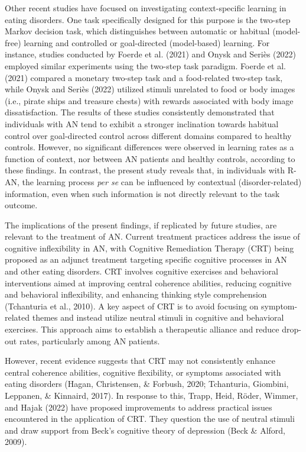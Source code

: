 \documentclass[
  man,floatsintext]{apa6}
\begin{document}
Other recent studies have focused on investigating context-specific learning in eating disorders. One task specifically designed for this purpose is the two-step Markov decision task, which distinguishes between automatic or habitual (model-free) learning and controlled or goal-directed (model-based) learning. For instance, studies conducted by Foerde et al. (2021) and Onysk and Seriès (2022) employed similar experiments using the two-step task paradigm. Foerde et al. (2021) compared a monetary two-step task and a food-related two-step task, while Onysk and Seriès (2022) utilized stimuli unrelated to food or body images (i.e., pirate ships and treasure chests) with rewards associated with body image dissatisfaction. The results of these studies consistently demonstrated that individuals with AN tend to exhibit a stronger inclination towards habitual control over goal-directed control across different domains compared to healthy controls. However, no significant differences were observed in learning rates as a function of context, nor between AN patients and healthy controls, according to these findings. In contrast, the present study reveals that, in individuals with R-AN, the learning process \emph{per se} can be influenced by contextual (disorder-related) information, even when such information is not directly relevant to the task outcome.

The implications of the present findings, if replicated by future studies, are relevant to the treatment of AN. Current treatment practices address the issue of cognitive inflexibility in AN, with Cognitive Remediation Therapy (CRT) being proposed as an adjunct treatment targeting specific cognitive processes in AN and other eating disorders. CRT involves cognitive exercises and behavioral interventions aimed at improving central coherence abilities, reducing cognitive and behavioral inflexibility, and enhancing thinking style comprehension (Tchanturia et al., 2010). A key aspect of CRT is to avoid focusing on symptom-related themes and instead utilize neutral stimuli in cognitive and behavioral exercises. This approach aims to establish a therapeutic alliance and reduce drop-out rates, particularly among AN patients.

However, recent evidence suggests that CRT may not consistently enhance central coherence abilities, cognitive flexibility, or symptoms associated with eating disorders (Hagan, Christensen, \& Forbush, 2020; Tchanturia, Giombini, Leppanen, \& Kinnaird, 2017). In response to this, Trapp, Heid, Röder, Wimmer, and Hajak (2022) have proposed improvements to address practical issues encountered in the application of CRT. They question the use of neutral stimuli and draw support from Beck's cognitive theory of depression (Beck \& Alford, 2009).
\end{document}
